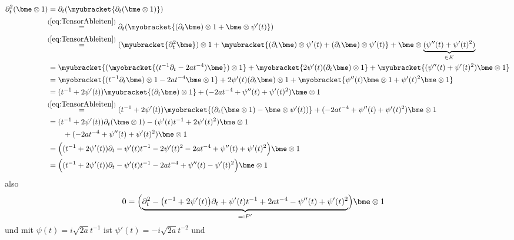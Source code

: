 \begin{align*}
\partial_t^2(\bme\otimes 1)
  &=\partial_t(\myubracket{\partial_t(\bme\otimes 1)})
\\&\!\!\overset{(\ref{eq:TensorAbleiten})}{=}
    \partial_t(\myobracket{(\partial_t\bme)\otimes 1
    + \bme\otimes \psi'(t)})
\\&\!\!\overset{(\ref{eq:TensorAbleiten})}{=}
    (\myubracket{\partial_t^2 \bme})\otimes 1
    + \myubracket{(\partial_t \bme)\otimes \psi'(t)
    +               (\partial_t \bme)\otimes \psi'(t)}
    + \bme\otimes\underset{\in K}{\underbrace{(\psi''(t) + \psi'(t)^2)}}
\\&= \myubracket{(\myobracket{(t^{-1}\partial_t - 2at^{-4}) \bme})\otimes 1}
    + \myobracket{2\psi'(t) (\partial_t \bme)\otimes 1}
    + \myubracket{(\psi''(t) + \psi'(t)^2)\bme\otimes 1}
\\&= \myobracket{ (t^{-1}\partial_t \bme)\otimes 1 - 2at^{-4} \bme\otimes 1 }
    + 2\psi'(t) (\partial_t \bme)\otimes 1 + \myobracket{
      \psi''(t) \bme\otimes 1 + \psi'(t)^2 \bme\otimes 1
    }
\\&= (t^{-1} + 2\psi'(t)) \myubracket{(\partial_t \bme)\otimes 1}
    + (- 2at^{-4} + \psi''(t) + \psi'(t)^2) \bme\otimes 1
\\&\!\!\overset{(\ref{eq:TensorAbleiten})}{=}
    (t^{-1} + 2\psi'(t))\myobracket{(\partial_t (\bme\otimes 1)
    - \bme\otimes \psi'(t))}+ (- 2at^{-4} + \psi''(t) + \psi'(t)^2)
    \bme\otimes 1
\\&\begin{aligned}
    &= (t^{-1} + 2\psi'(t))\partial_t (\bme\otimes 1)
    - (\psi'(t) t^{-1} + 2\psi'(t)^2)\bme\otimes 1\\
    &\qquad + (- 2at^{-4} + \psi''(t) + \psi'(t)^2) \bme\otimes 1 \\
  \end{aligned}
\\&= \Big((t^{-1} + 2\psi'(t))\partial_t - \psi'(t) t^{-1} - 2\psi'(t)^2
    - 2at^{-4} + \psi''(t) + \psi'(t)^2\Big) \bme\otimes 1
\\&= \Big((t^{-1} + 2\psi'(t))\partial_t - \psi'(t) t^{-1} - 2at^{-4}
    + \psi''(t) - \psi'(t)^2\Big) \bme\otimes 1
\end{align*}
also
\begin{align*}
0 &= \Big( \underset{=:P'}{\underbrace{
    \partial_t^2 - \big(t^{-1} + 2\psi'(t)\big)\partial_t
    + \psi'(t) t^{-1} + 2at^{-4} -\psi''(t)
    + \psi'(t)^2 }} \Big) \bme\otimes 1
\end{align*}
und mit $\psi(t)=i\sqrt{2a}t^{-1}$ ist $\psi'(t)=-i\sqrt{2a}t^{-2}$ und

